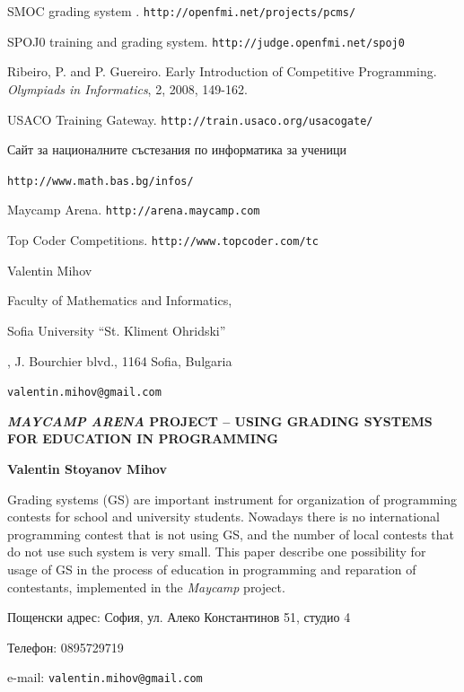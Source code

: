 \documentclass[11pt]{article}
\begin{document}
\noindent [3] SMOC grading system .
\texttt{http://openfmi.net/projects/pcms/}

\noindent [4] SPOJ0 training and grading system.
\texttt{http://judge.openfmi.net/spoj0}

\noindent [5] Ribeiro, P. and P. Guereiro. Early Introduction of
Competitive Program\-ming. \textit{Olympiads in Informatics}, 2,
2008, 149-162. \noindent

\noindent [6] USACO Training Gateway.
\texttt{http://train.usaco.org/usacogate/}

\noindent [7] Сайт за националните състезания по информатика 
за ученици

\texttt{http://www.math.bas.bg/infos/}

\noindent [8] Maycamp Arena. \texttt{http://arena.maycamp.com}

\noindent [9] Top Coder Competitions.
\texttt{http://www.topcoder.com/tc}

\vspace*{5mm}


\noindent Valentin Mihov

\noindent Faculty of Mathematics and Informatics,

\noindent Sofia University ``St. Kliment Ohridski''

, J. Bourchier blvd., 1164 Sofia, Bulgaria

\noindent \texttt{valentin.mihov@gmail.com}

\newpage
\begin{center}
{\large \textbf{\textit{MAYCAMP ARENA} PROJECT -- USING GRADING
SYSTEMS FOR EDUCATION IN PROGRAMMING}}

\vspace*{5mm}

\textbf{Valentin Stoyanov Mihov}

\end {center}

\vspace*{5mm}
\parbox{11,7cm}{\footnotesize
Grading systems (GS) are important instrument for organization of
programming contests for school and university students. Nowadays
there is no international programming contest that is not using GS,
and the number of local contests that do not use such system is very
small. This paper describe one possibility for usage of GS in the
process of education in programming and reparation of contestants,
implemented in the  \textit{Maycamp} project. }

\newpage


Пощенски адрес: София, ул. Алеко Константинов 51, студио 4

Телефон: 0895729719

e-mail: \texttt{valentin.mihov@gmail.com}
\end{document}
